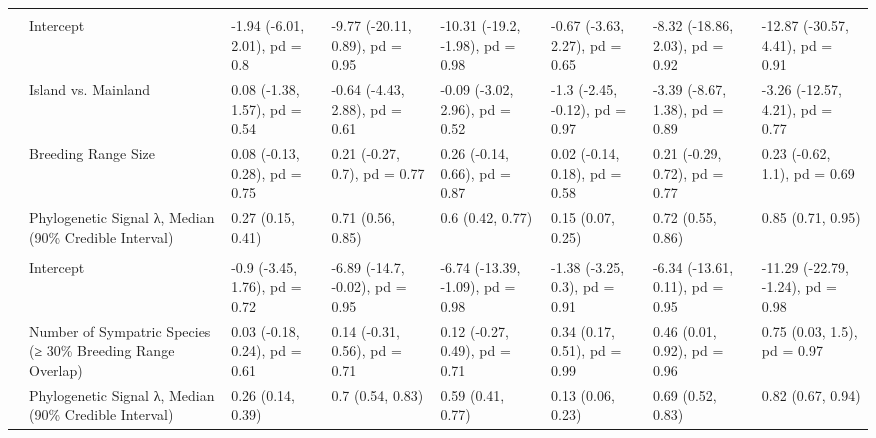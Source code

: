 \begin{table}
{\begin{tabular}[t]{llllllll}
\addlinespace[0.3em]
\multicolumn{1}{l}{\textbf{Breeding Spacing}}\\
\hspace{1em} & Intercept & -1.94 (-6.01, 2.01), pd = 0.8 & -9.77 (-20.11, 0.89), pd = 0.95 & -10.31 (-19.2, -1.98), pd = 0.98 & -0.67 (-3.63, 2.27), pd = 0.65 & -8.32 (-18.86, 2.03), pd = 0.92 & -12.87 (-30.57, 4.41), pd = 0.91\\
\hspace{1em} & Island vs. Mainland & 0.08 (-1.38, 1.57), pd = 0.54 & -0.64 (-4.43, 2.88), pd = 0.61 & -0.09 (-3.02, 2.96), pd = 0.52 & -1.3 (-2.45, -0.12), pd = 0.97 & -3.39 (-8.67, 1.38), pd = 0.89 & -3.26 (-12.57, 4.21), pd = 0.77\\
\hspace{1em} & Breeding Range Size & 0.08 (-0.13, 0.28), pd = 0.75 & 0.21 (-0.27, 0.7), pd = 0.77 & 0.26 (-0.14, 0.66), pd = 0.87 & 0.02 (-0.14, 0.18), pd = 0.58 & 0.21 (-0.29, 0.72), pd = 0.77 & 0.23 (-0.62, 1.1), pd = 0.69\\
\hspace{1em} & Phylogenetic Signal λ, Median (90\% Credible Interval) & 0.27 (0.15, 0.41) & 0.71 (0.56, 0.85) & 0.6 (0.42, 0.77) & 0.15 (0.07, 0.25) & 0.72 (0.55, 0.86) & 0.85 (0.71, 0.95)\\
\addlinespace[0.3em]
\multicolumn{1}{l}{\textbf{Breeding Sympatry}}\\
\hspace{1em} & Intercept & -0.9 (-3.45, 1.76), pd = 0.72 & -6.89 (-14.7, -0.02), pd = 0.95 & -6.74 (-13.39, -1.09), pd = 0.98 & -1.38 (-3.25, 0.3), pd = 0.91 & -6.34 (-13.61, 0.11), pd = 0.95 & -11.29 (-22.79, -1.24), pd = 0.98\\
 & Number of Sympatric Species 
\hspace{1em} (≥ 30\% Breeding Range Overlap) & 0.03 (-0.18, 0.24), pd = 0.61 & 0.14 (-0.31, 0.56), pd = 0.71 & 0.12 (-0.27, 0.49), pd = 0.71 & 0.34 (0.17, 0.51), pd = 0.99 & 0.46 (0.01, 0.92), pd = 0.96 & 0.75 (0.03, 1.5), pd = 0.97\\
\hspace{1em} & Phylogenetic Signal λ, Median (90\% Credible Interval) & 0.26 (0.14, 0.39) & 0.7 (0.54, 0.83) & 0.59 (0.41, 0.77) & 0.13 (0.06, 0.23) & 0.69 (0.52, 0.83) & 0.82 (0.67, 0.94)\\
\bottomrule
\end{tabular}}
\end{table}